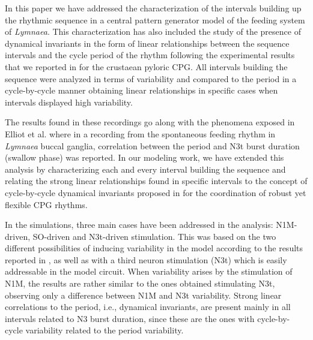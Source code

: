 In this paper we have addressed the characterization of the intervals building up the rhythmic sequence in a central pattern generator model of the feeding system of \textit{Lymnaea}. This characterization has also included the study of the presence of dynamical invariants in the form of linear relationships between the sequence intervals and the cycle period of the rhythm following the experimental results that we reported in \cite{Elices2019} for the crustaean pyloric CPG. All intervals building the sequence were analyzed in terms of variability and compared to the period in a cycle-by-cycle manner obtaining linear relationships in specific cases when intervals displayed high variability. 

The results found in these recordings go along with the phenomena exposed in Elliot et al. \cite{Elliott1991} where in a recording from the spontaneous feeding rhythm in \textit{Lymnaea} buccal ganglia, correlation between the period and N3t burst duration (swallow phase) was reported. In our modeling work, we have extended this analysis by characterizing each and every interval building the sequence and relating the strong linear relationships found in specific intervals to the concept of cycle-by-cycle dynamical invariants proposed in \cite{Elices2019} for the coordination of robust yet flexible CPG rhythms.

In the simulations, three main cases have been addressed in the analysis: N1M-driven, SO-driven and N3t-driven stimulation. This was based on the two different possibilities of inducing variability in the model according to the results reported in \cite{Vavoulis2007}, as well as with a third neuron stimulation (N3t) which is easily addressable in the model circuit. When variability arises by the stimulation of N1M, the results are rather similar to the ones obtained stimulating N3t, observing  only a difference between N1M and N3t variability. %
Strong linear correlations to the period, i.e.,  dynamical invariants, are present mainly in all intervals related to N3 burst duration, since these are the ones with cycle-by-cycle variability related to the period variability. 


